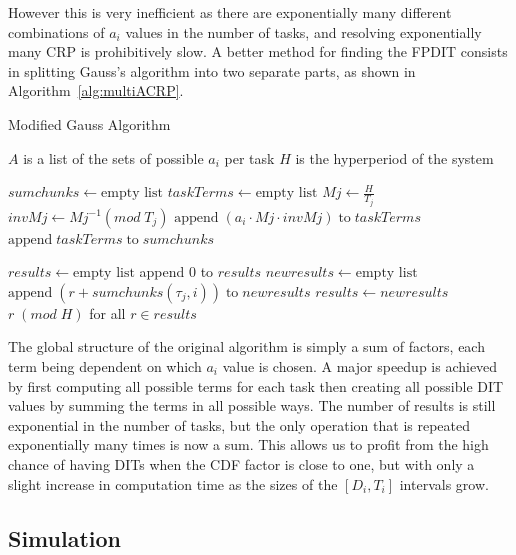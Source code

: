 \documentclass[conference]{IEEEtran}
\begin{document}
		However this is very inefficient as there are exponentially many different
		combinations of $a_i$ values in the number of tasks, and resolving
		exponentially many CRP is prohibitively slow. A better method for finding the
		FPDIT consists in splitting Gauss's algorithm into two separate parts, as
		shown in Algorithm~\ref{alg:multiACRP}. 
		
		\begin{algorithm}
			\caption{Modified Gauss Algorithm}
			\label{alg:multiACRP}
			\begin{algorithmic}[1]
				\REQUIRE $A$ is a list of the sets of possible $a_i$ per task
				\REQUIRE $H$ is the hyperperiod of the system
				
				\STATE $sumchunks \leftarrow \text{empty list}$
					\STATE $taskTerms \leftarrow \text{empty list}$ 
					\STATE $Mj \leftarrow \frac{H}{T_j}$
					\STATE $invMj \leftarrow Mj^{-1} (mod \; T_j)$
						\STATE $\text{append} \; (a_i \cdot Mj \cdot invMj) \; \text{to} \; taskTerms$
					\ENDFOR
					\STATE $\text{append} \; taskTerms \; \text{to} \; sumchunks$
				\ENDFOR
				
				\STATE $results \leftarrow \text{empty list}$
				\STATE append $0$ to $results$
					\STATE $newresults \leftarrow \text{empty list}$
							\STATE $\text{append} \; (r + sumchunks(\tau_j,i)) \; \text{to} \; newresults$
						\ENDFOR
					\ENDFOR
					\STATE $results \leftarrow newresults$
				\ENDFOR
				\RETURN $r \; (mod \; H)$ for all $r \in results$
			\end{algorithmic}
		\end{algorithm}
		
		The global structure of the original algorithm is simply a sum of factors, each term being dependent on which $a_i$ value is chosen. A major
		speedup is achieved by first computing all possible terms for each task
		then creating all possible DIT values by summing the terms in all possible
		ways. The number of results is still exponential in the number of tasks, but
		the only operation that is repeated exponentially many times is now a sum.
		This allows us to profit from the high chance of having DITs when the CDF
		factor is close to one, but with only a slight increase in computation time as the sizes of the $[D_i, T_i]$ intervals grow.

	\subsection{Simulation}
	\label{sct:noFPDITsimu}
\end{document}
